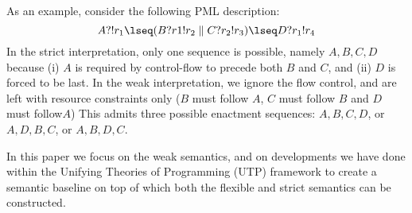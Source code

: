 As an example, consider the following PML description:
\[
 A?!r_1 \lseq (B?r1!r_2 \parallel C?r_2!r_3) \lseq D?r_1!r_4
\]
In the strict interpretation, only one sequence is possible,
namely $A,B,C,D$ because (i) $A$ is required by control-flow
to precede both $B$ and $C$, and (ii) $D$ is forced to be last.
In the weak interpretation, we ignore the flow control,
and are left with resource constraints only
($B$ must follow $A$, $C$ must follow $B$ and $D$ must follow$A$)
This admits three possible enactment sequences:
$A,B,C,D$,
or $A,D,B,C$,
or $A,B,D,C$.

In this paper we focus on the weak semantics,
and on developments we have done within the Unifying Theories
of Programming (UTP) framework \cite{Hoare-He98} to create a semantic baseline
on top of which both the flexible and strict semantics can be constructed.
